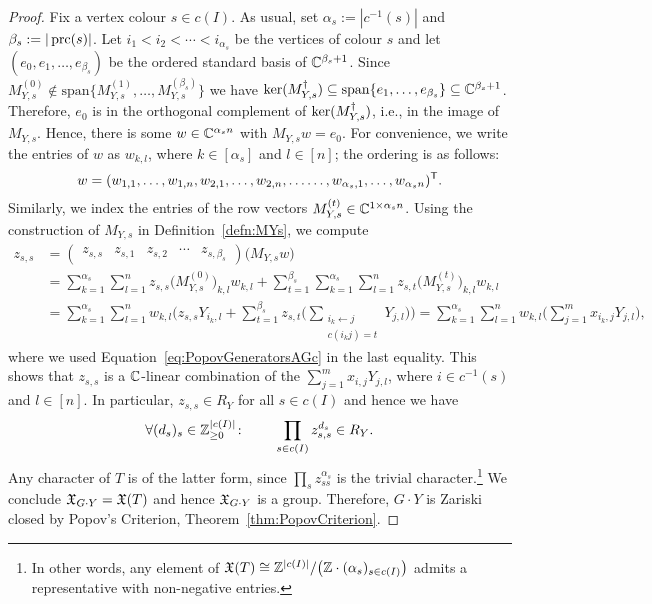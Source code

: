 \begin{proof}
	Fix a vertex colour $s \in c(I)$. As usual, set $\alpha_s := | c^{-1}(s) |$ and $\beta_s := |\operatorname{prc}(s)|$. Let $i_1 < i_2 < \cdots < i_{\alpha_s}$ be the vertices of colour $s$ and let $(e_0,e_1,\ldots,e_{\beta_s})$ be the ordered standard basis of $\mathbb C^{\beta_s + 1}$. Since $M_{Y,s}^{(0)} \notin \mathrm{span} \big\lbrace M_{Y,s}^{(1)},\ldots,M_{Y,s}^{(\beta_s)} \big\rbrace$ we have $\ker(M_{Y,s}^{\dagger}) \subseteq \mathrm{span}\{e_1, \ldots, e_{\beta_s}\} \subseteq \mathbb C^{\beta_s + 1}$. Therefore, $e_0$ is in the orthogonal complement of $\ker(M_{Y,s}^{\dagger})$, i.e., in the image of $M_{Y,s}$. Hence, there is some $w \in \mathbb C^{\alpha_s n}$ with $M_{Y,s}w = e_0$.
	For convenience, we write the entries of $w$ as $w_{k,l}$, where $k \in [\alpha_s]$ and $l \in [n]$; the ordering is as follows:
		\[ w = (w_{1,1}, \ldots, w_{1,n}, w_{2,1}, \ldots, w_{2,n}, \ldots \ldots, w_{\alpha_s,1}, \ldots, w_{\alpha_s n})^{\mathsf{T}} . \]
	Similarly, we index the entries of the row vectors $M_{Y,s}^{(t)} \in \mathbb C^{1 \times \alpha_s n}$.
	Using the construction of $M_{Y,s}$ in Definition~\ref{defn:MYs}, we compute
		\begin{align*}
			z_{s,s} &= \begin{pmatrix} z_{s,s} & z_{s,1} & z_{s,2} & \cdots & z_{s, \beta_s} \end{pmatrix} \big( M_{Y,s} w \big) \\
			&=  \sum_{k=1}^{\alpha_s} \sum_{l =1}^{n} z_{s,s} \big( M^{(0)}_{Y,s} \big)_{k,l} w_{k,l}  + \sum_{t=1}^{\beta_s} \sum_{k=1}^{\alpha_s} \sum_{l =1}^{n} z_{s,t} \big( M^{(t)}_{Y,s} \big)_{k,l} w_{k,l} \\
			&=  \sum_{k=1}^{\alpha_s} \sum_{l =1}^{n} w_{k,l} \bigg( z_{s,s} Y_{i_k,l} + \sum_{t=1}^{\beta_s} z_{s,t} \Big( \sum_{\substack{i_k \leftarrow j\\c(i_{k} j) = t}} Y_{j,l} \Big) \bigg)
			= \sum_{k=1}^{\alpha_s} \sum_{l =1}^{n} w_{k,l} \bigg( \sum_{j=1}^m x_{i_k,j} Y_{j,l} \bigg) ,
		\end{align*}
	where we used Equation~\eqref{eq:PopovGeneratorsAGc} in the last equality.
	This shows that $z_{s,s}$ is a $\mathbb C$-linear combination of the $\sum_{j=1}^m x_{i,j} Y_{j,l}$, where $i \in c^{-1}(s)$ and $l \in [n]$. In particular, $z_{s,s} \in R_Y$ for all $s \in c(I)$ and hence we have
		\[ \forall (d_s)_s \in \mathbb Z_{\geq 0}^{|c(I)|} \colon \qquad \prod_{s \in c(I)} z_{s,s}^{d_s} \in R_Y .\]
	Any character of $T$ is of the latter form, since $\prod_{s} z_{ss}^{\alpha_s}$ is the trivial character.\footnote{In other words, any element of $\mathfrak{X}(T) \cong \mathbb Z^{|c(I)|} / \big( \mathbb Z \cdot (\alpha_s)_{s \in c(I)} \big)$ admits a representative with non-negative entries.}
	We conclude $\mathfrak{X}_{G \cdot Y} = \mathfrak{X}(T)$ and hence $\mathfrak{X}_{G \cdot Y}$ is a group. Therefore, $G \cdot Y$ is Zariski closed by Popov's Criterion, Theorem~\ref{thm:PopovCriterion}.
\end{proof}




